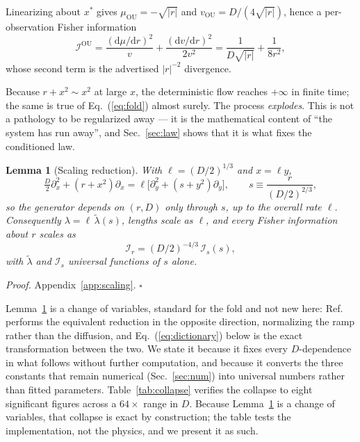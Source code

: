 \documentclass[%
 twocolumn,
 superscriptaddress,
 amsmath,amssymb,
 aps,
 pre,
 floatfix,
]{revtex4-2}
\newtheorem{lemma}{Lemma}
\newcommand{\dd}{\mathrm{d}}
\newcommand{\Ifish}{\mathcal{I}}
\begin{document}
Linearizing about $x^\ast$ gives $\mu_{\mathrm{OU}}=-\sqrt{|r|}$ and $v_{\mathrm{OU}}=D/(4\sqrt{|r|})$, hence a per-observation Fisher information
\begin{equation}
\label{eq:iou}
\Ifish^{\mathrm{OU}}
=\frac{(\dd\mu/\dd r)^2}{v}+\frac{(\dd v/\dd r)^2}{2v^2}
=\frac{1}{D\sqrt{|r|}}+\frac{1}{8r^2},
\end{equation}
whose second term is the advertised $|r|^{-2}$ divergence.

Because $r+x^2\sim x^2$ at large $x$, the deterministic flow reaches $+\infty$ in finite time; the same is true of Eq.~(\ref{eq:fold}) almost surely.  The process \emph{explodes}.  This is not a pathology to be regularized away --- it is the mathematical content of ``the system has run away'', and Sec.~\ref{sec:law} shows that it is what fixes the conditioned law.

\begin{lemma}[Scaling reduction]
\label{thm:scaling}
With $\ell=(D/2)^{1/3}$ and $x=\ell y$,
\begin{equation}
\label{eq:generator}
\tfrac D2\partial_x^2+(r+x^2)\partial_x
=\ell\bigl[\partial_y^2+(s+y^2)\partial_y\bigr],
\qquad s\equiv \frac{r}{(D/2)^{2/3}},
\end{equation}
so the generator depends on $(r,D)$ only through $s$, up to the overall rate $\ell$.  Consequently $\lambda=\ell\,\tilde\lambda(s)$, lengths scale as $\ell$, and every Fisher information about $r$ scales as
\begin{equation}
\label{eq:Iscale}
\Ifish_r=(D/2)^{-4/3}\,\Ifish_s(s),
\end{equation}
with $\tilde\lambda$ and $\Ifish_s$ universal functions of $s$ alone.
\end{lemma}

\noindent\textit{Proof.} Appendix~\ref{app:scaling}. $\square$

Lemma~\ref{thm:scaling} is a change of variables, standard for the fold and not new here: Ref.~\cite{HerbertBouchet2017} performs the equivalent reduction in the opposite direction, normalizing the ramp rather than the diffusion, and Eq.~(\ref{eq:dictionary}) below is the exact transformation between the two.  We state it because it fixes every $D$-dependence in what follows without further computation, and because it converts the three constants that remain numerical (Sec.~\ref{sec:num}) into universal numbers rather than fitted parameters.  Table~\ref{tab:collapse} verifies the collapse to eight significant figures across a $64\times$ range in $D$.  Because Lemma~\ref{thm:scaling} is a change of variables, that collapse is exact by construction; the table tests the implementation, not the physics, and we present it as such.
\end{document}
